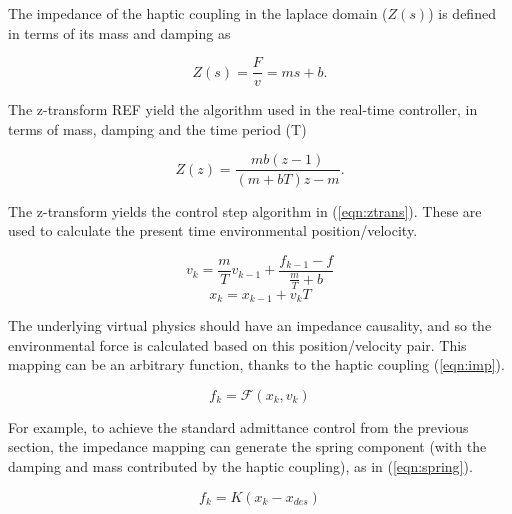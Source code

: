 \documentclass[12pt]{report}
\begin{document}
		
		
	
	
	The impedance of the haptic coupling in the laplace domain ($Z(s)$) is defined in terms of its mass and damping as
	
	\begin{equation} \label{eqn:haptic}
		Z(s) = \frac{F}{v} = ms + b .
	\end{equation}
	
The z-transform REF yield the algorithm used in the real-time controller, in terms of mass, damping and the time period (T) 	

	\begin{equation}
		Z(z) = \frac{mb(z-1)}{(m+bT)z - m}.
	\end{equation}
	
	The z-transform yields the control step algorithm in (\ref{eqn:ztrans}). These are used to calculate the present time environmental position/velocity. 

\begin{equation} \label{eqn:ztrans}
	v_k = \frac{m}{T}v_{k-1} + \frac{f_{k-1} - f}{\frac{m}{T} + b}
\end{equation}
\begin{equation}
	x_k = x_{k-1} + v_{k}T
\end{equation}

	
The underlying virtual physics should have an impedance causality, and so the environmental force is calculated based on this position/velocity pair. This mapping can be an arbitrary function, thanks to the haptic coupling (\ref{eqn:imp}). 
 
\begin{equation} \label{eqn:imp}
	f_k = \mathcal{F}(x_k, v_k)
\end{equation}

For example, to achieve the standard admittance control from the previous section, the impedance mapping can generate the spring component (with the damping and mass contributed by the haptic coupling), as in (\ref{eqn:spring}).

\begin{equation} \label{eqn:spring} 
	f_k = K(x_k - x_{des})
\end{equation}
\end{document}
